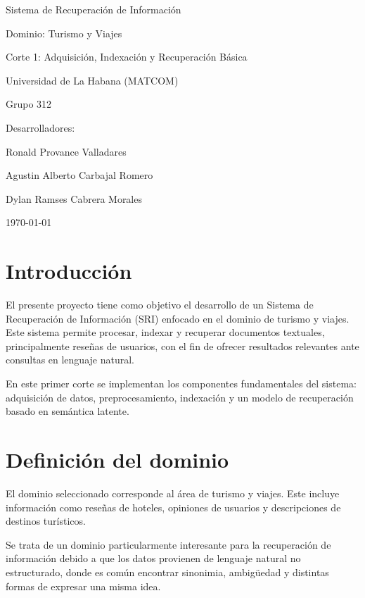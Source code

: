\documentclass[12pt]{article}
\begin{document}
	\begin{titlepage}
		\centering
		{\LARGE Sistema de Recuperación de Información\par}
		\vspace{0.5cm}
		{\Large Dominio: Turismo y Viajes\par}
		\vspace{0.5cm}
		{\Large Corte 1: Adquisición, Indexación y Recuperación Básica\par}
		\vspace{0.8cm}
		{\large Universidad de La Habana (MATCOM)\par}
		\vspace{1.5cm}
		{\large Grupo 312\par}
		\vspace{0.5cm}
		{\large Desarrolladores:\par}
		{\large Ronald Provance Valladares\par}
		{\large Agustin Alberto Carbajal Romero\par}
		{\large Dylan Ramses Cabrera Morales\par}
		\vfill
		{\large \today\par}
	\end{titlepage}
	
	\section{Introducción}
	
	El presente proyecto tiene como objetivo el desarrollo de un Sistema de Recuperación de Información (SRI) enfocado en el dominio de turismo y viajes. Este sistema permite procesar, indexar y recuperar documentos textuales, principalmente reseñas de usuarios, con el fin de ofrecer resultados relevantes ante consultas en lenguaje natural.
	
	En este primer corte se implementan los componentes fundamentales del sistema: adquisición de datos, preprocesamiento, indexación y un modelo de recuperación basado en semántica latente.
	
	\section{Definición del dominio}
	
	El dominio seleccionado corresponde al área de turismo y viajes. Este incluye información como reseñas de hoteles, opiniones de usuarios y descripciones de destinos turísticos.
	
	Se trata de un dominio particularmente interesante para la recuperación de información debido a que los datos provienen de lenguaje natural no estructurado, donde es común encontrar sinonimia, ambigüedad y distintas formas de expresar una misma idea.
	
\end{document}
